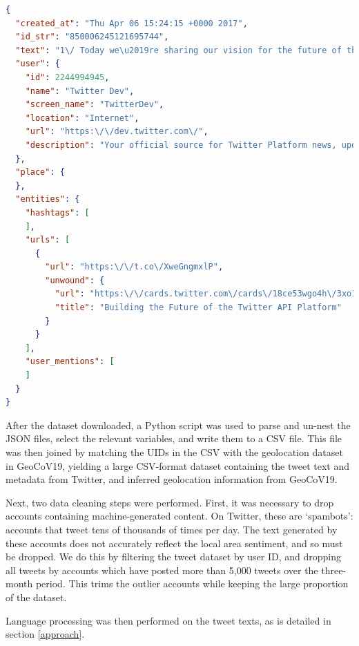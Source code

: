 \documentclass{article}
\begin{document}
\begin{singlespace}
\begin{lstlisting}[language=json,numbers=none,caption=Example Tweet object JSON file \parencite{twitterinc.DataDictionaryStandard2021}]
{
  "created_at": "Thu Apr 06 15:24:15 +0000 2017",
  "id_str": "850006245121695744",
  "text": "1\/ Today we\u2019re sharing our vision for the future of the Twitter API platform!\nhttps:\/\/t.co\/XweGngmxlP",
  "user": {
    "id": 2244994945,
    "name": "Twitter Dev",
    "screen_name": "TwitterDev",
    "location": "Internet",
    "url": "https:\/\/dev.twitter.com\/",
    "description": "Your official source for Twitter Platform news, updates & events. Need technical help? Visit https:\/\/twittercommunity.com\/ \u2328\ufe0f #TapIntoTwitter"
  },
  "place": {   
  },
  "entities": {
    "hashtags": [      
    ],
    "urls": [
      {
        "url": "https:\/\/t.co\/XweGngmxlP",
        "unwound": {
          "url": "https:\/\/cards.twitter.com\/cards\/18ce53wgo4h\/3xo1c",
          "title": "Building the Future of the Twitter API Platform"
        }
      }
    ],
    "user_mentions": [     
    ]
  }
}
\end{lstlisting}
\end{singlespace}
After the dataset downloaded, a Python script was used to parse and un-nest the JSON files, select the relevant variables, and write them to a CSV file. This file was then joined by matching the UIDs in the CSV with the geolocation dataset in GeoCoV19, yielding a large CSV-format dataset containing the tweet text and metadata from Twitter, and inferred geolocation information from GeoCoV19.

Next, two data cleaning steps were performed. First, it was necessary to drop accounts containing machine-generated content. On Twitter, these are `spambots': accounts that tweet tens of thousands of times per day. The text generated by these accounts does not accurately reflect the local area sentiment, and so must be dropped. We do this by filtering the tweet dataset by user ID, and dropping all tweets by accounts which have posted more than 5,000 tweets over the three-month period. This trims the outlier accounts while keeping the large proportion of the dataset.


Language processing was then performed on the tweet texts, as is detailed in section \ref{approach}. 
\end{document}
